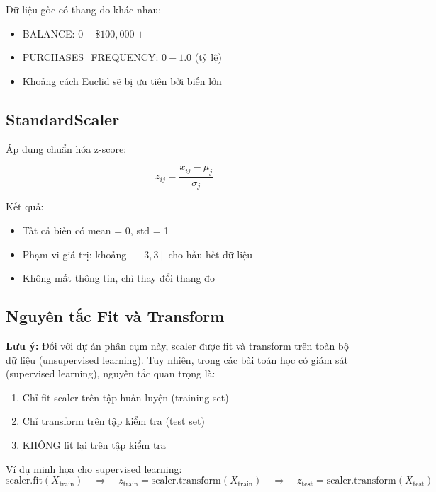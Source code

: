 Dữ liệu gốc có thang đo khác nhau:
\begin{itemize}
    \item BALANCE: $0 - \$100,000+$
    \item PURCHASES\_FREQUENCY: $0 - 1.0$ (tỷ lệ)
    \item Khoảng cách Euclid sẽ bị ưu tiên bởi biến lớn
\end{itemize}

\subsection{StandardScaler}

Áp dụng chuẩn hóa z-score:

\begin{equation}
z_{ij} = \frac{x_{ij} - \mu_j}{\sigma_j}
\end{equation}

Kết quả:
\begin{itemize}
    \item Tất cả biến có mean = 0, std = 1
    \item Phạm vi giá trị: khoảng $[-3, 3]$ cho hầu hết dữ liệu
    \item Không mất thông tin, chỉ thay đổi thang đo
\end{itemize}

\subsection{Nguyên tắc Fit và Transform}

\textbf{Lưu ý:} Đối với dự án phân cụm này, scaler được fit và transform trên toàn bộ dữ liệu (unsupervised learning). Tuy nhiên, trong các bài toán học có giám sát (supervised learning), nguyên tắc quan trọng là:

\begin{enumerate}
    \item Chỉ fit scaler trên tập huấn luyện (training set)
    \item Chỉ transform trên tập kiểm tra (test set)
    \item KHÔNG fit lại trên tập kiểm tra
\end{enumerate}

Ví dụ minh họa cho supervised learning:
\begin{equation}
\text{scaler.fit}(X_{\text{train}})
\quad \Rightarrow \quad
z_{\text{train}} = \text{scaler.transform}(X_{\text{train}})
\quad \Rightarrow \quad
z_{\text{test}} = \text{scaler.transform}(X_{\text{test}})
\end{equation}

